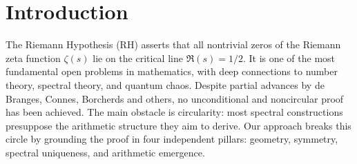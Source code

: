 \section{Introduction}
The Riemann Hypothesis (RH) asserts that all nontrivial zeros of the Riemann zeta function $\zeta(s)$ lie on the critical line $\Re(s) = 1/2$. It is one of the most fundamental open problems in mathematics, with deep connections to number theory, spectral theory, and quantum chaos. Despite partial advances by de Branges, Connes, Borcherds and others, no unconditional and noncircular proof has been achieved. The main obstacle is circularity: most spectral constructions presuppose the arithmetic structure they aim to derive. Our approach breaks this circle by grounding the proof in four independent pillars: geometry, symmetry, spectral uniqueness, and arithmetic emergence.